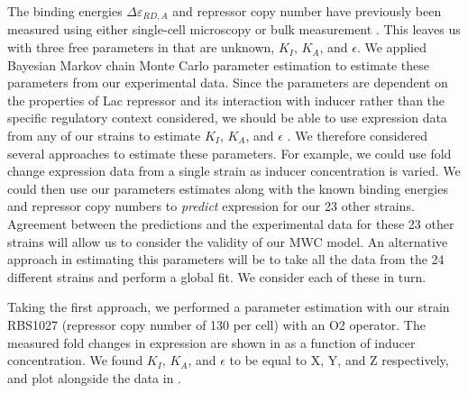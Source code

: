 The binding energies $\Delta \varepsilon_{RD,A}$ and repressor copy number have previously been measured using either single-cell microscopy or bulk measurement \cite{Oehler1994,Vilar2003,Garcia2011, Brewster2014}. This leaves us with three free parameters in \eref[eq7] that are unknown, $K_I$, $K_A$, and $\epsilon$. We applied Bayesian Markov chain Monte Carlo parameter estimation to estimate these parameters from our experimental data. Since the parameters are dependent on the properties of Lac repressor and its interaction with inducer rather than the specific regulatory context considered, we should be able to use expression data from any of our strains to estimate $K_I$, $K_A$, and $\epsilon$ . We therefore considered several approaches to estimate these parameters.
For example, we could use fold change expression data from a single strain as inducer concentration is varied. We could then use our parameters estimates along with the known binding energies and repressor copy numbers to \textit{predict} expression for our 23 other strains. Agreement between the predictions and the experimental data for these 23 other strains will allow us to consider the validity of our MWC model. An alternative approach in estimating this parameters will be to take all the data from the 24 different strains and perform a global fit. We consider each of these in turn. 


 Taking the first approach, we performed a parameter estimation with our
strain RBS1027 (repressor copy number of 130 per cell) with an O2 operator.
The measured fold changes in expression are shown in  as a
function of inducer concentration. We found $K_I$, $K_A$, and $\epsilon$ to be
equal to X, Y, and Z respectively, and plot \eref[eq7] alongside the data in
. 


